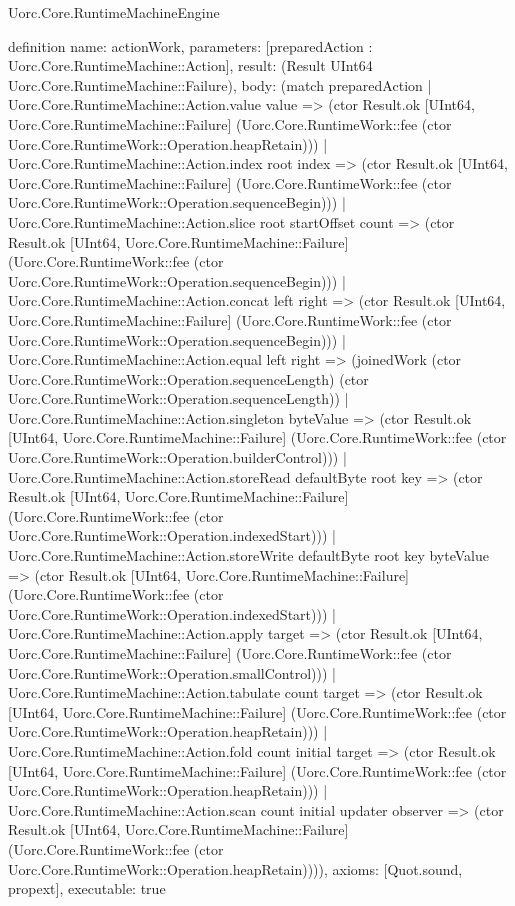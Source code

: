 \begin{lexlean}{Uorc.Core.RuntimeMachineEngine}
\begin{semanticmodule}
definition{
  name: actionWork,
  parameters: [preparedAction : Uorc.Core.RuntimeMachine::Action],
  result: (Result UInt64 Uorc.Core.RuntimeMachine::Failure),
  body: (match preparedAction
    | Uorc.Core.RuntimeMachine::Action.value value => (ctor Result.ok [UInt64, Uorc.Core.RuntimeMachine::Failure] (Uorc.Core.RuntimeWork::fee (ctor Uorc.Core.RuntimeWork::Operation.heapRetain)))
    | Uorc.Core.RuntimeMachine::Action.index root index => (ctor Result.ok [UInt64, Uorc.Core.RuntimeMachine::Failure] (Uorc.Core.RuntimeWork::fee (ctor Uorc.Core.RuntimeWork::Operation.sequenceBegin)))
    | Uorc.Core.RuntimeMachine::Action.slice root startOffset count => (ctor Result.ok [UInt64, Uorc.Core.RuntimeMachine::Failure] (Uorc.Core.RuntimeWork::fee (ctor Uorc.Core.RuntimeWork::Operation.sequenceBegin)))
    | Uorc.Core.RuntimeMachine::Action.concat left right => (ctor Result.ok [UInt64, Uorc.Core.RuntimeMachine::Failure] (Uorc.Core.RuntimeWork::fee (ctor Uorc.Core.RuntimeWork::Operation.sequenceBegin)))
    | Uorc.Core.RuntimeMachine::Action.equal left right => (joinedWork (ctor Uorc.Core.RuntimeWork::Operation.sequenceLength) (ctor Uorc.Core.RuntimeWork::Operation.sequenceLength))
    | Uorc.Core.RuntimeMachine::Action.singleton byteValue => (ctor Result.ok [UInt64, Uorc.Core.RuntimeMachine::Failure] (Uorc.Core.RuntimeWork::fee (ctor Uorc.Core.RuntimeWork::Operation.builderControl)))
    | Uorc.Core.RuntimeMachine::Action.storeRead defaultByte root key => (ctor Result.ok [UInt64, Uorc.Core.RuntimeMachine::Failure] (Uorc.Core.RuntimeWork::fee (ctor Uorc.Core.RuntimeWork::Operation.indexedStart)))
    | Uorc.Core.RuntimeMachine::Action.storeWrite defaultByte root key byteValue => (ctor Result.ok [UInt64, Uorc.Core.RuntimeMachine::Failure] (Uorc.Core.RuntimeWork::fee (ctor Uorc.Core.RuntimeWork::Operation.indexedStart)))
    | Uorc.Core.RuntimeMachine::Action.apply target => (ctor Result.ok [UInt64, Uorc.Core.RuntimeMachine::Failure] (Uorc.Core.RuntimeWork::fee (ctor Uorc.Core.RuntimeWork::Operation.smallControl)))
    | Uorc.Core.RuntimeMachine::Action.tabulate count target => (ctor Result.ok [UInt64, Uorc.Core.RuntimeMachine::Failure] (Uorc.Core.RuntimeWork::fee (ctor Uorc.Core.RuntimeWork::Operation.heapRetain)))
    | Uorc.Core.RuntimeMachine::Action.fold count initial target => (ctor Result.ok [UInt64, Uorc.Core.RuntimeMachine::Failure] (Uorc.Core.RuntimeWork::fee (ctor Uorc.Core.RuntimeWork::Operation.heapRetain)))
    | Uorc.Core.RuntimeMachine::Action.scan count initial updater observer => (ctor Result.ok [UInt64, Uorc.Core.RuntimeMachine::Failure] (Uorc.Core.RuntimeWork::fee (ctor Uorc.Core.RuntimeWork::Operation.heapRetain)))),
  axioms: [Quot.sound, propext],
  executable: true
}


\end{semanticmodule}
\end{lexlean}
